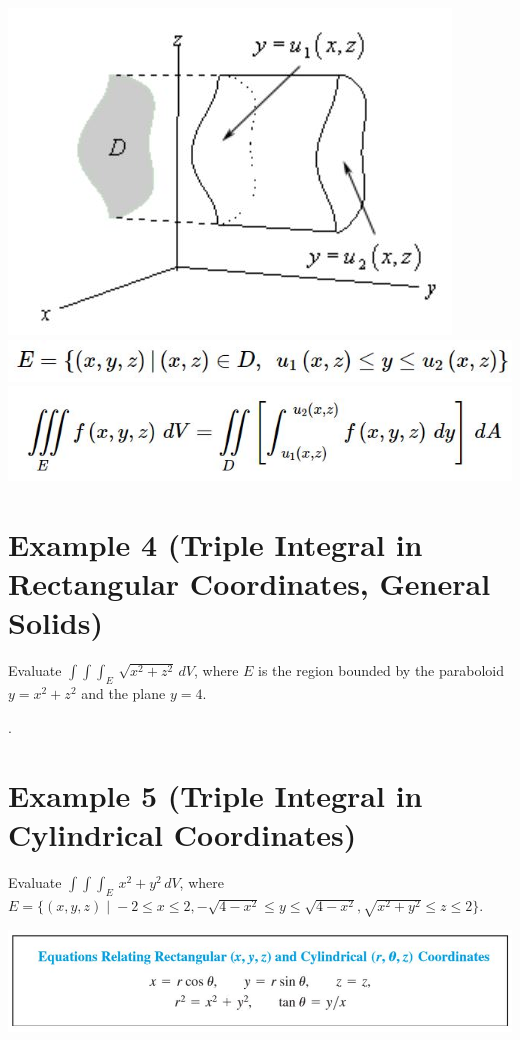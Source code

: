 \documentclass[11pt]{article}
\begin{document}
\includegraphics{Capture7.jpg}\\
\includegraphics{Capture8.jpg}\\
\includegraphics{Capture9.jpg}
\section*{Example 4 (Triple Integral in Rectangular Coordinates, General Solids)}
Evaluate $\int\int\int_E \, \sqrt{x^2+z^2} \, dV$, where $E$ is the region bounded by the paraboloid $y = x^2 + z^2$ and the plane $y = 4$.

\newpage
.
\newpage
\section*{Example 5 (Triple Integral in Cylindrical Coordinates)}

Evaluate $\int\int\int_E \, x^2 + y^2 \, dV$, where $E = \{(x,y,z) \; | \; -2\leq x \leq 2, -\sqrt{4-x^2} \leq y \leq \sqrt{4-x^2}, \sqrt{x^2 + y^2} \leq z \leq 2 \}$.

\includegraphics{Capture10.jpg}
\end{document}
